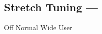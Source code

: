 \subsection[Stretch Tuning]{Stretch Tuning --- \UiKey{\I}\UiKey{\SET}}









































Off
Normal
Wide
User
